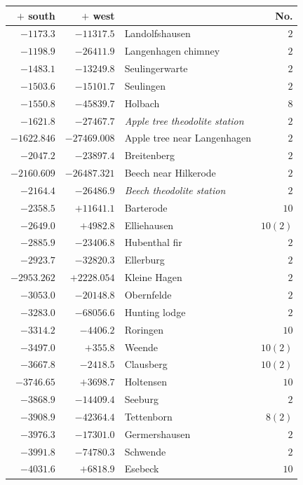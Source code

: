 \clearpage{}%
\begin{center}\begingroup\fontsize{8}{9}\selectfont
\setlength{\tabcolsep}{4pt}
\begin{tabular}{r|r|p{170pt}|r}\hline
\(+\) south&\(+\) west&&No.\\\hline
\(-1173.3\)&\(-11317.5\)&Landolfshausen&\(2\)\\
\(-1198.9\)&\(-26411.9\)&Langenhagen chimney&\(2\)\\
\(-1483.1\)&\(-13249.8\)&Seulingerwarte&\(2\)\\
\(-1503.6\)&\(-15101.7\)&Seulingen&\(2\)\\
\(-1550.8\)&\(-45839.7\)&Holbach&\(8\)\\
\(-1621.8\)&\(-27467.7\)&\textit{Apple tree theodolite station}&\(2\)\\
\(-1622.846\)&\(-27469.008\)&Apple tree near Langenhagen&\(2\)\\
\(-2047.2\)&\(-23897.4\)&Breitenberg&\(2\)\\
\(-2160.609\)&\(-26487.321\)&Beech near Hilkerode&\(2\)\\
\(-2164.4\)&\(-26486.9\)&\textit{Beech theodolite station}&\(2\)\\
\(-2358.5\)&\(+11641.1\)&Barterode&\(10\)\\
\(-2649.0\)&\(+4982.8\)&Elliehausen&\(10 (2)\)\\
\(-2885.9\)&\(-23406.8\)&Hubenthal fir&\(2\)\\
\(-2923.7\)&\(-32820.3\)&Ellerburg&\(2\)\\
\(-2953.262\)&\(+2228.054\)&Kleine Hagen&\(2\)\\
\(-3053.0\)&\(-20148.8\)&Obernfelde&\(2\)\\
\(-3283.0\)&\(-68056.6\)&Hunting lodge&\(2\)\\
\(-3314.2\)&\(-4406.2\)&Roringen&\(10\)\\
\(-3497.0\)&\(+355.8\)&Weende&\(10 (2)\)\\
\(-3667.8\)&\(-2418.5\)&Clausberg&\(10 (2)\)\\
\(-3746.65\)&\(+3698.7\)&Holtensen&\(10\)\\
\(-3868.9\)&\(-14409.4\)&Seeburg&\(2\)\\
\(-3908.9\)&\(-42364.4\)&Tettenborn&\(8 (2)\)\\
\(-3976.3\)&\(-17301.0\)&Germershausen&\(2\)\\
\(-3991.8\)&\(-74780.3\)&Schwende&\(2\)\\
\(-4031.6\)&\(+6818.9\)&Esebeck&\(10\)\\

\end{tabular}
\end{center}
